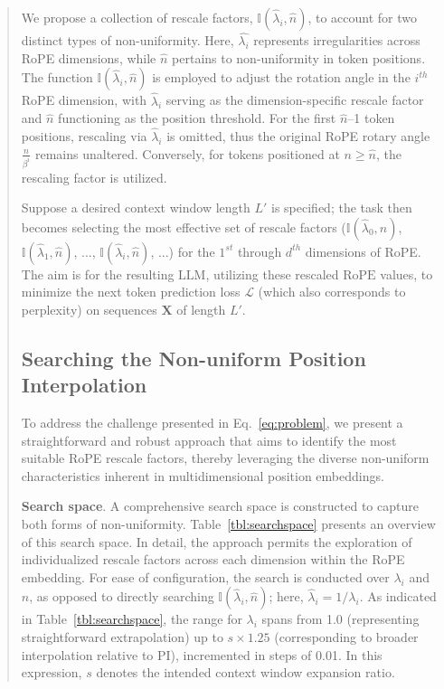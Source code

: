 \begin{abstract}
We propose a collection of rescale factors, $\mathbb{I}(\hat{\lambda}_{i},\hat{n})$, to account for two distinct types of non-uniformity. Here, $\hat{\lambda_i}$ represents irregularities across RoPE dimensions, while $\hat{n}$ pertains to non-uniformity in token positions. The function $\mathbb{I}(\hat{\lambda}_{i},\hat{n})$ is employed to adjust the rotation angle in the $i^{th}$ RoPE dimension, with $\hat\lambda_{i}$ serving as the dimension-specific rescale factor and $\hat{n}$ functioning as the position threshold. For the first $\hat{n}$–1 token positions, rescaling via $\hat\lambda_{i}$ is omitted, thus the original RoPE rotary angle $\frac{n}{\beta^i}$ remains unaltered. Conversely, for tokens positioned at $n \ge \hat{n}$, the rescaling factor is utilized.

Suppose a desired context window length $L'$ is specified; the task then becomes selecting the most effective set of rescale factors ($\mathbb{I}(\hat{\lambda}_{0},\hat{n})$, $\mathbb{I}(\hat{\lambda}_{1},\hat{n})$, ..., $\mathbb{I}(\hat{\lambda}_{i},\hat{n})$, ...) for the $1^{st}$ through $d^{th}$ dimensions of RoPE. The aim is for the resulting $\text{LLM}$, utilizing these rescaled $\text{RoPE}$ values, to minimize the next token prediction loss $\mathcal{L}$ (which also corresponds to perplexity) on sequences $\mathbf{X}$ of length $L'$.

\subsection{Searching the Non-uniform Position Interpolation}

To address the challenge presented in Eq.~\ref{eq:problem}, we present a straightforward and robust approach that aims to identify the most suitable RoPE rescale factors, thereby leveraging the diverse non-uniform characteristics inherent in multidimensional position embeddings.

\textbf{Search space}. A comprehensive search space is constructed to capture both forms of non-uniformity. Table~\ref{tbl:searchspace} presents an overview of this search space. In detail, the approach permits the exploration of individualized rescale factors across each dimension within the RoPE embedding. For ease of configuration, the search is conducted over $\lambda_i$ and $\hat{n}$, as opposed to directly searching $\mathbb{I}(\hat{\lambda}_{i},\hat{n})$; here, $\hat{\lambda}_{i}=1/\lambda_i$. As indicated in Table~\ref{tbl:searchspace}, the range for $\lambda_i$ spans from 1.0 (representing straightforward extrapolation) up to $s\times1.25$ (corresponding to broader interpolation relative to PI), incremented in steps of 0.01. In this expression, $s$ denotes the intended context window expansion ratio.


\end{abstract}
